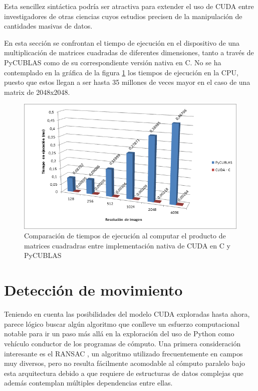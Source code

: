 \documentclass[twocolumn,twoside]{Jornadas}
\begin{document}
Esta sencillez sintáctica podría ser atractiva para extender el uso de CUDA entre investigadores de otras ciencias cuyos estudios precisen de la manipulación de cantidades masivas de datos. 

En esta sección se confrontan el tiempo de ejecución en el dispositivo de una multiplicación de matrices cuadradas de diferentes dimensiones, tanto a través de PyCUBLAS como de su correspondiente versión nativa en C. No se ha contemplado en la gráfica de la figura \ref{fig:pycublas} los tiempos de ejecución en la CPU, puesto que estos llegan a ser hasta 35 millones de veces mayor en el caso de una matrix de 2048x2048.

\begin{figure}
   \begin{center}
      \includegraphics[width=.5\textwidth]{pycublas.png}
      \caption{\label{fig:pycublas}Comparación de tiempos de ejecución al computar el producto de matrices cuadradras entre implementación nativa de CUDA en C y PyCUBLAS}
   \end{center}
\end{figure}

\section{Detección de movimiento}

Teniendo en cuenta las posibilidades del modelo CUDA exploradas hasta ahora, parece lógico buscar algún algoritmo que conlleve un esfuerzo computacional notable para ir un paso más allá en la exploración del uso de Python como vehículo conductor de los programas de cómputo. Una primera consideración interesante es el RANSAC \cite{Jiayin:2010:CMD:1933304.1933936}, un algoritmo utilizado frecuentemente en campos muy diversos, pero no resulta fácilmente acomodable al cómputo paralelo bajo esta arquitectura debido a que requiere de estructuras de datos complejas que además contemplan múltiples dependencias entre ellas.

\vspace{5 mm}
\end{document}
